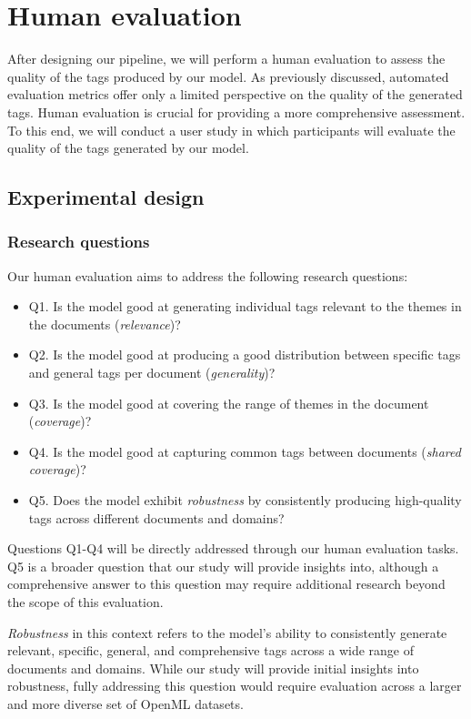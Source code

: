 \section{Human evaluation}
\label{sec:human_evaluation}
After designing our pipeline, we will perform a human evaluation to assess the quality of the tags produced by our model. As previously discussed, automated evaluation metrics offer only a limited perspective on the quality of the generated tags. Human evaluation is crucial for providing a more comprehensive assessment. To this end, we will conduct a user study in which participants will evaluate the quality of the tags generated by our model.

\subsection{Experimental design}
\subsubsection{Research questions}
Our human evaluation aims to address the following research questions:

\begin{itemize}
\item Q1. Is the model good at generating individual tags relevant to the themes in the documents (\textit{relevance})?
\item Q2. Is the model good at producing a good distribution between specific tags and general tags per document (\textit{generality})?
\item Q3. Is the model good at covering the range of themes in the document (\textit{coverage})?
\item Q4. Is the model good at capturing common tags between documents (\textit{shared coverage})?
\item Q5. Does the model exhibit \textit{robustness} by consistently producing high-quality tags across different documents and domains?
\end{itemize}

Questions Q1-Q4 will be directly addressed through our human evaluation tasks. Q5 is a broader question that our study will provide insights into, although a comprehensive answer to this question may require additional research beyond the scope of this evaluation.

\textit{Robustness} in this context refers to the model's ability to consistently generate relevant, specific, general, and comprehensive tags across a wide range of documents and domains. While our study will provide initial insights into robustness, fully addressing this question would require evaluation across a larger and more diverse set of OpenML datasets.

